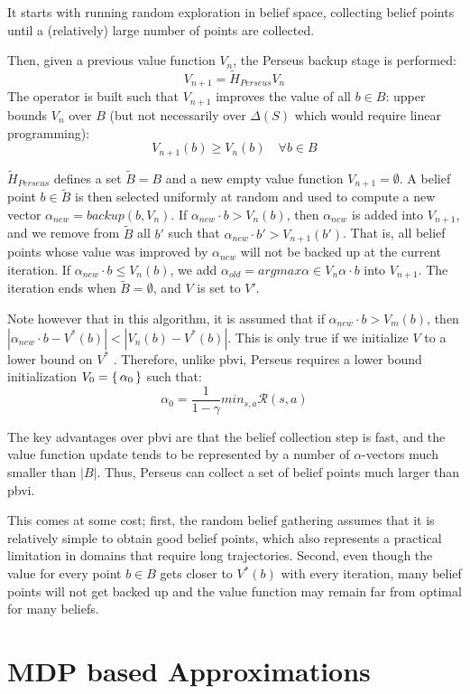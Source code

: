 It starts with running random exploration in belief space, collecting belief points 
until a (relatively) large number of points are collected.

Then, given a previous value function $V_n$, the Perseus backup stage is performed: 
$$V_{n+1} = \tilde{H}_{Perseus} V_n$$ 
The operator is built such that $V_{n+1}$ improves the value of all $b \in B$:
upper bounds $V_n$ over $B$ (but not necessarily over $\Delta(S)$ which would require linear programming):
$$V_{n+1}(b) \geq V_n(b) \quad \forall b \in B$$

$\tilde{H}_{Perseus}$ defines a set $\tilde{B} = B$ and a new empty
value function $V_{n+1} = \emptyset$. A belief point $b \in \tilde{B}$ is then selected uniformly at random and used to
compute a new vector $\alpha_{new} = backup(b,V_n)$. If $\alpha_{new}\cdot b > V_n(b)$, then $\alpha_{new}$ is added into
$V_{n+1}$, and we remove from $\tilde{B}$ all $b'$ such that $\alpha_{new} \cdot b' > V_{n+1}(b')$. 
That is, all belief points whose value was improved by $\alpha_{new}$ will not be backed up at the 
current iteration. If $\alpha_{new} \cdot b \leq V_n (b)$, 
we add $\alpha_{old} = argmax \alpha \in V_n \alpha \cdot b$ into $V_{n+1}$. 
The iteration ends when $\tilde{B} = \emptyset$, and $V$ is set to $V'$.

Note however that in this algorithm, it is assumed that if $\alpha_{new} \cdot b > V_m(b)$,
then $|\alpha_{new} \cdot b - V^*(b)| < |V_n(b) - V^* (b)|$. 
This is only true if we initialize $V$ to a lower bound on $V^*$ . Therefore, unlike \gls{pbvi}, 
Perseus requires a lower bound initialization $V_0 = \set{\alpha_0}$ such that:
$$\alpha_0 = \frac{1}{1-\gamma}min_{s,a}\mathcal{R}(s,a)$$

The key advantages over \gls{pbvi} are that the belief collection step is fast, and the value function
update tends to be represented by a number of $\alpha$-vectors much smaller than $|B|$.
Thus, Perseus can collect a set of belief points much larger than \gls{pbvi}.

This comes at some cost; first, the random belief
gathering assumes that it is relatively simple to obtain good belief points, 
which also represents a practical limitation in domains that require long trajectories.
Second, even though the value for every point $b \in B$ gets closer to $V^*(b)$ with every
iteration, many belief points will not get backed up and the value function may remain far from
optimal for many beliefs. 

\section{MDP based Approximations}

